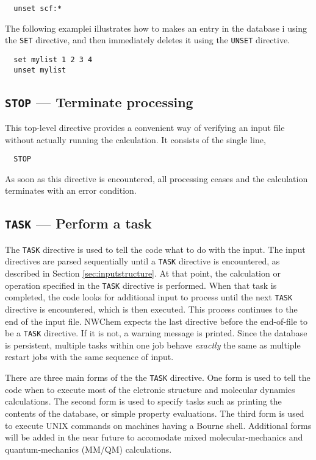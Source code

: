 \begin{verbatim}
  unset scf:*
\end{verbatim}

The following examplei illustrates how to makes an entry in the database i
using the \verb+SET+ directive, 
and then immediately deletes it using the \verb+UNSET+ directive.

\begin{verbatim}
  set mylist 1 2 3 4
  unset mylist
\end{verbatim}



\subsection{{\tt STOP} --- Terminate processing}

This top-level directive provides a convenient way of verifying 
an input file without actually running the calculation.  It consists 
of the single line,

\begin{verbatim}
  STOP
\end{verbatim}

As soon as this directive is encountered, all processing ceases and
the calculation terminates with an error condition.

\subsection{{\tt TASK} --- Perform a task}
\label{sec:task}

The \verb+TASK+ directive is used to tell the code what to do with the
input.  The input directives are parsed sequentially until a
\verb+TASK+ directive is encountered, as described in Section
\ref{sec:inputstructure}.  At that point, the calculation or operation
specified in the \verb+TASK+ directive is performed.  When that task
is completed, the code looks for additional input to process until the
next \verb+TASK+ directive is encountered, which is then executed.
This process continues to the end of the input file.  NWChem expects
the last directive before the end-of-file to be a \verb+TASK+
directive.  If it is not, a warning message is printed.  Since the
database is persistent, multiple tasks within one job behave {\em
  exactly} the same as multiple restart jobs with the same sequence of
input.

There are three main forms of the the \verb+TASK+ directive.  One form is
used to tell the code when to execute most of the elctronic structure 
and molecular dynamics
calculations.  The second form is used to specify tasks such as
printing the contents of the database, or simple property
evaluations.  The third form is used to execute UNIX commands on machines
having a Bourne shell.  Additional forms will be added in the near
future to accomodate mixed molecular-mechanics and quantum-mechanics
(MM/QM) calculations.

